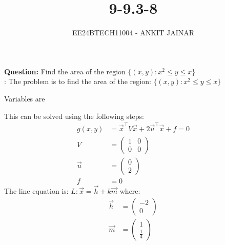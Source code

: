 \documentclass[journal]{IEEEtran}
\begin{document}

\vspace{3cm}

\title{9-9.3-8}
\author{EE24BTECH11004 - ANKIT JAINAR
}
{\let\newpage\relax\maketitle}

\renewcommand{\thefigure}{\theenumi}
\renewcommand{\thetable}{\theenumi}
\setlength{\intextsep}{10pt} %


\renewcommand{\thetable}{\theenumi}

\textbf{Question:} Find the area of the region $\{(x, y) : x^2 \leq y \leq x \}$ \\
\solution: The problem is to find the area of the region:
$\{(x, y) : x^2 \leq y \leq x \}$
\begin{table}[h!]    
  \centering
  
  \caption{Variables are}
  \label{tab 3.2.15}
\end{table}
This can be solved using the following steps:
\begin{align}
    g(x, y) &= \vec{x}^\top V \vec{x} + 2\vec{u}^\top \vec{x} + f = 0 \\
    V &= \begin{pmatrix} 1 & 0 \\ 0 & 0 \end{pmatrix} \\
    \vec{u} &= \begin{pmatrix} 0 \\ 2 \end{pmatrix} \\
    f &= 0
\end{align}
The line equation is:
$L: \vec{x} = \vec{h} + k \vec{m}$
where:
\begin{align}
    \vec{h} &= \begin{pmatrix} -2 \\ 0 \end{pmatrix} \\
    \vec{m} &= \begin{pmatrix} 1 \\ \frac{1}{4} \end{pmatrix}
\end{align}
\end{document}
